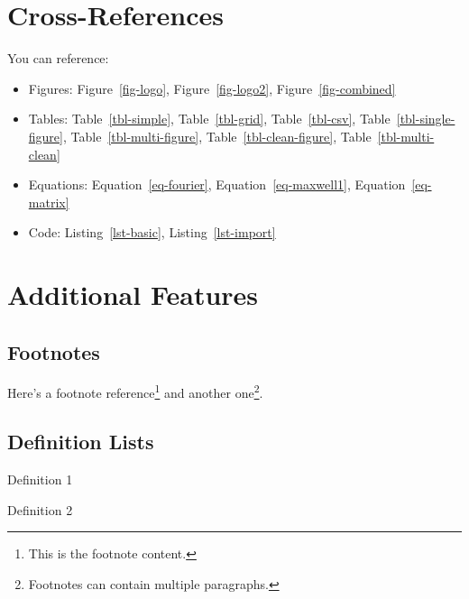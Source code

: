 \documentclass[
  letterpaper,
  oneside,
  openany]{MastersDoctoralThesis}
\providecommand{\tightlist}{%
  \setlength{\itemsep}{0pt}\setlength{\parskip}{0pt}}\usepackage{longtable,booktabs,array}
\theoremstyle{plain}
\theoremstyle{remark}
\begin{document}
\section*{Cross-References}\label{sec-crossrefs}


You can reference:

\begin{itemize}
\tightlist
\item
  Figures: Figure~\ref{fig-logo}, Figure~\ref{fig-logo2},
  Figure~\ref{fig-combined}
\item
  Tables: Table~\ref{tbl-simple}, Table~\ref{tbl-grid},
  Table~\ref{tbl-csv}, Table~\ref{tbl-single-figure},
  Table~\ref{tbl-multi-figure}, Table~\ref{tbl-clean-figure},
  Table~\ref{tbl-multi-clean}
\item
  Equations: Equation~\ref{eq-fourier}, Equation~\ref{eq-maxwell1},
  Equation~\ref{eq-matrix}
\item
  Code: Listing~\ref{lst-basic}, Listing~\ref{lst-import}
\end{itemize}

\section*{Additional Features}\label{additional-features}


\subsection*{Footnotes}\label{footnotes}

Here's a footnote reference\footnote{This is the footnote content.} and
another one\footnote{Footnotes can contain multiple paragraphs.}.

\subsection*{Definition Lists}\label{definition-lists}

\begin{description}
\tightlist
\item[Term 1]
Definition 1
\item[Term 2]
Definition 2
\end{description}
\end{document}
